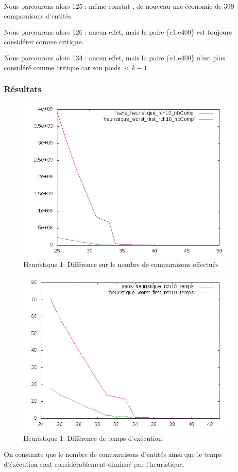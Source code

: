 \documentclass[a4paper,10pt]{article}
\begin{document}
Nous parcourons alors 125 : même constat , de nouveau une économie de 399 comparaisons d'entités.

Nous parcourons alors 126 : aucun effet, mais la paire \{e1,e400\} est toujours considérer comme critique.

Nous parcourons alors 134 : aucun effet, mais la paire  \{e1,e400\} n'est plus considéré comme critique car son poids $<k-1$.

\subsubsection*{Résultats}
\begin{figure}[H]
\begin{center}
\includegraphics[scale=0.6]{./graphique/diff1_nbComp.png}
\end{center}
\caption{Heuristique 1: Différence sur le nombre de comparaisons effectués}
\end{figure}
\begin{figure}[H]
\begin{center}
\includegraphics[scale=0.6]{./graphique/diff1_temps.png}
\end{center}
\caption{Heuristique 1: Différence de temps d'exécution}
\end{figure}
On constante que le nombre de comparaisons d'entités ainsi que le temps d'éxécution sont considérablement diminué par l'heuristique.
\end{document}
